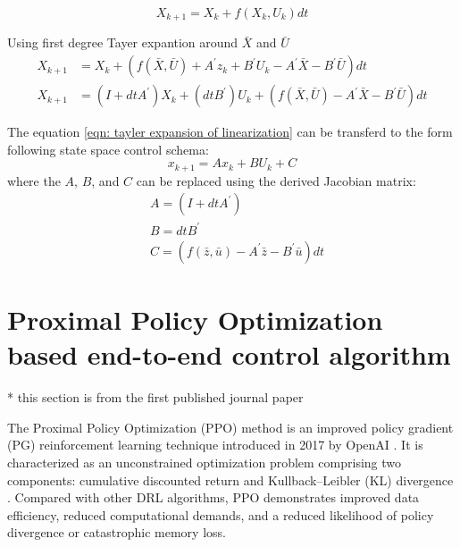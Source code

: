 \begin{equation}
X_{k+1}=X_k+f\left(X_k, U_k\right) dt
\end{equation}

Using first degree Tayer expantion around $\bar{X}$ and $\bar{U}$
\begin{equation}
\begin{aligned}
X_{k+1}&=X_k+\left(f(\bar{X}, \bar{U})+A^{\prime} z_k+B^{\prime} U_k-A^{\prime} \bar{X}-B^{\prime} \bar{U}\right) d t \\
X_{k+1}&=\left(I+d t A^{\prime}\right) X_k+\left(d t B^{\prime}\right) U_k+\left(f(\bar{X}, \bar{U})-A^{\prime} \bar{X}-B^{\prime} \bar{U}\right) d t
\end{aligned}
\label{eqn: tayler expansion of linearization}
\end{equation}

The equation \ref{eqn: tayler expansion of linearization} can be transferd to the form following state space control schema: 
\begin{equation}
x_{k+1}=A x_k+B U_k+C
\end{equation}
where the $A$, $B$, and $C$ can be replaced using the derived Jacobian matrix:
\begin{equation}
\begin{aligned}
& A=\left(I+d t A^{\prime}\right) \\
& B=d t B^{\prime} \\
& C=\left(f(\bar{z}, \bar{u})-A^{\prime} \bar{z}-B^{\prime} \bar{u}\right) d t
\end{aligned}
\end{equation}

\section{Proximal Policy Optimization based end-to-end control algorithm}
\label{section: PPO based end to end control algorithm}

* this section is from the first published journal paper \cite{Yan_Zohdy_Shaout_Mahmoud_2023}

The Proximal Policy Optimization (PPO) method is an improved policy gradient (PG) reinforcement learning technique introduced in 2017 by OpenAI \parencite{schulman2017proximal}. It is characterized as an unconstrained optimization problem comprising two components: cumulative discounted return and Kullback–Leibler (KL) divergence \parencite{xu2023improving}. Compared with other DRL algorithms, PPO demonstrates improved data efficiency, reduced computational demands, and a reduced likelihood of policy divergence or catastrophic memory loss.

